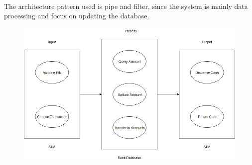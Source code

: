 \documentclass{article}
\begin{document}
		\paragraph{} The architecture pattern used is pipe and filter, since the system is mainly data processing and focus on updating the database.
		\begin{figure}[h!]
			\begin{center}
				\includegraphics[width=\linewidth]{img/architecture.png}
			\end{center}
		\end{figure}


	\newpage
	
	
\end{document}
